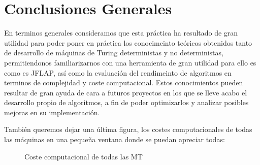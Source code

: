 \section{Conclusiones Generales}

En terminos generales consideramos que esta práctica ha resultado de gran utilidad para poder poner en práctica los conocimeinto teóricos obtenidos tanto de desarrollo de máquinas de Turing deterministas y no deterministas, permitiendonos familiarizarnos con una herramienta de gran utilidad para ello es como es JFLAP, así como la evaluación del rendimeinto de algoritmos en terminos de complejidad y coste computacional.
Estos conocimientos pueden resultar de gran ayuda de cara a futuros proyectos en los que se lleve acabo el desarrollo propio de algoritmos, a fin de poder optimizarlos y analizar posibles mejoras en su implementación.

\bigskip

También queremos dejar una última figura, los costes computacionales de todas las máquinas en una pequeña ventana donde se puedan apreciar todas:
\begin{figure}[H]
  \centering
  
  \caption{Coste computacional de todas las MT}
\end{figure}
